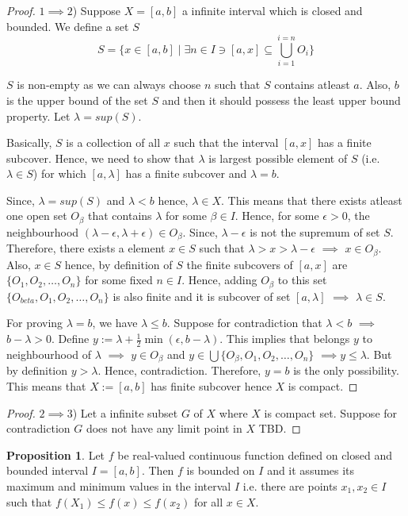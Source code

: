 \documentclass[12pt]{report}
\theoremstyle{definition}
\newtheorem{prop}{Proposition}
\begin{document}
\begin{proof}
    $1\implies 2$) Suppose $X = [a,b]$ a infinite interval which is closed and bounded. We define a set $S$
    $$ S = \{x \in [a,b] \mid \exists n \in I \ni [a,x] \subseteq \bigcup\limits_{i = 1}^{i = n} O_i\}$$

    $S$ is non-empty as we can always choose $n$ such that $S$ contains atleast $a$. Also, $b$ is the upper bound of the set $S$ and then it should possess the least upper bound property. Let $\lambda = sup(S)$.

    Basically, $S$ is a collection of all $x$ such that the interval $[a, x]$ has a finite subcover. Hence, we need to show that $\lambda$ is largest possible element of $S$ (i.e. $\lambda \in S$) for which $[a, \lambda]$ has a finite subcover and $\lambda = b$.

    Since, $\lambda = sup(S)$ and $\lambda < b$ hence, $\lambda \in X$. This means that there exists atleast one open set $O_{\beta}$ that contains $\lambda$ for  some $\beta \in I$. Hence, for some $\epsilon > 0$, the neighbourhood $(\lambda - \epsilon, \lambda + \epsilon) \in O_{\beta}$. Since, $\lambda - \epsilon$ is not the supremum of set $S$. Therefore, there exists a element $x \in S$ such that $\lambda > x > \lambda - \epsilon$ $\implies$ $x \in O_{\beta}$. Also, $x \in S$ hence, by definition of $S$ the finite subcovers of $[a, x]$ are $\{ O_1, O_2, \dots, O_{n}\}$ for some fixed $n \in I$. Hence, adding $O_{\beta}$ to this set $\{ O_{beta}, O_1, O_2, \dots, O_{n}\}$ is also finite and it is subcover of set $[a, \lambda]$ $\implies$ $\lambda \in S$.

    For proving $\lambda = b$, we have $\lambda \leq b$. Suppose for contradiction that $\lambda < b$ $\implies$ $b - \lambda > 0$. Define $y := \lambda + \frac{1}{2}\min(\epsilon, b-\lambda)$. This implies that belongs $y$ to neighbourhood of $\lambda$ $\implies$ $ y \in O_{\beta}$ and $y \in \bigcup\{ O_{\beta}, O_1, O_2, \dots, O_{n}\}$ $\implies y \leq \lambda$. But by definition $y > \lambda$. Hence, contradiction. Therefore, $y = b$ is the only possibility. This means that $X:= [a, b]$ has finite subcover hence $X$ is compact.
\end{proof}
\begin{proof}
    $2 \implies 3$) Let a infinite subset $G$ of $X$ where $X$ is compact set. Suppose for contradiction $G$ does not have any limit point in $X$ TBD.
\end{proof}
\begin{prop}
    Let $f$ be real-valued continuous function defined on closed and bounded interval $I = [a, b]$. Then $f$ is bounded on $I$ and it assumes its maximum and minimum values in the interval $I$ i.e. there are points $x_1, x_2 \in I$ such that $f(X_1) \leq f(x)  \leq f(x_2)$ for all $x \in X$.
\end{prop}
\end{document}
